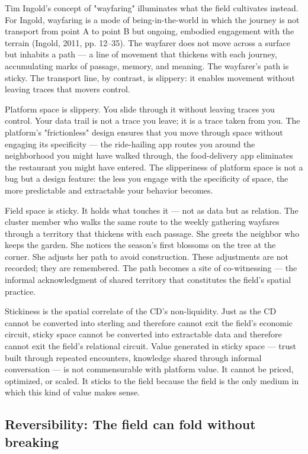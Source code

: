 Tim Ingold's concept of "wayfaring" illuminates what the field cultivates instead. For Ingold, wayfaring is a mode of being-in-the-world in which the journey is not transport from point A to point B but ongoing, embodied engagement with the terrain (Ingold, 2011, pp. 12–35). The wayfarer does not move across a surface but inhabits a path — a line of movement that thickens with each journey, accumulating marks of passage, memory, and meaning. The wayfarer's path is sticky. The transport line, by contrast, is slippery: it enables movement without leaving traces that movers control.

Platform space is slippery. You slide through it without leaving traces you control. Your data trail is not a trace you leave; it is a trace taken from you. The platform's "frictionless" design ensures that you move through space without engaging its specificity — the ride-hailing app routes you around the neighborhood you might have walked through, the food-delivery app eliminates the restaurant you might have entered. The slipperiness of platform space is not a bug but a design feature: the less you engage with the specificity of space, the more predictable and extractable your behavior becomes.

Field space is sticky. It holds what touches it — not as data but as relation. The cluster member who walks the same route to the weekly gathering wayfares through a territory that thickens with each passage. She greets the neighbor who keeps the garden. She notices the season's first blossoms on the tree at the corner. She adjusts her path to avoid construction. These adjustments are not recorded; they are remembered. The path becomes a site of co-witnessing — the informal acknowledgment of shared territory that constitutes the field's spatial practice.

Stickiness is the spatial correlate of the CD's non-liquidity. Just as the CD cannot be converted into sterling and therefore cannot exit the field's economic circuit, sticky space cannot be converted into extractable data and therefore cannot exit the field's relational circuit. Value generated in sticky space — trust built through repeated encounters, knowledge shared through informal conversation — is not commensurable with platform value. It cannot be priced, optimized, or scaled. It sticks to the field because the field is the only medium in which this kind of value makes sense.

\subsection{Reversibility: The field can fold without breaking}

